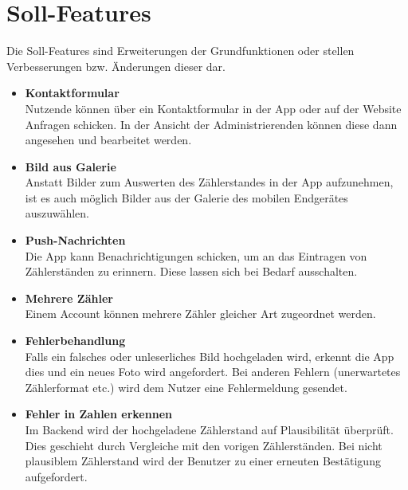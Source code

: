 \section{Soll-Features}
Die Soll-Features sind Erweiterungen der Grundfunktionen oder stellen Verbesserungen bzw. Änderungen dieser dar.
\begin{itemize}
\item \textbf{Kontaktformular} \hfill \\
	Nutzende können über ein Kontaktformular in der App oder auf der Website Anfragen schicken.
	In der Ansicht der Administrierenden können diese dann angesehen und bearbeitet werden. 
\item \textbf{Bild aus Galerie} \hfill \\
	Anstatt Bilder zum Auswerten des Zählerstandes in der App aufzunehmen, ist es auch möglich Bilder aus der Galerie des mobilen Endgerätes auszuwählen.
\item \textbf{Push-Nachrichten} \hfill \\
	Die App kann Benachrichtigungen schicken, um an das Eintragen von Zählerständen zu erinnern.
	Diese lassen sich bei Bedarf ausschalten.
\item \textbf{Mehrere Zähler}\hfill \\
	Einem Account können mehrere Zähler gleicher Art zugeordnet werden.
\item \textbf{Fehlerbehandlung} \hfill \\
	Falls ein falsches oder unleserliches Bild hochgeladen wird, erkennt die App dies und ein neues Foto wird angefordert. 
	Bei anderen Fehlern (unerwartetes Zählerformat etc.) wird dem Nutzer eine Fehlermeldung gesendet.
\item \textbf{Fehler in Zahlen erkennen} \hfill \\
	Im Backend wird der hochgeladene Zählerstand auf Plausibilität überprüft. Dies geschieht durch Vergleiche mit den vorigen Zählerständen. 
	Bei nicht plausiblem Zählerstand wird der Benutzer zu einer erneuten Bestätigung aufgefordert. 
\end{itemize}

